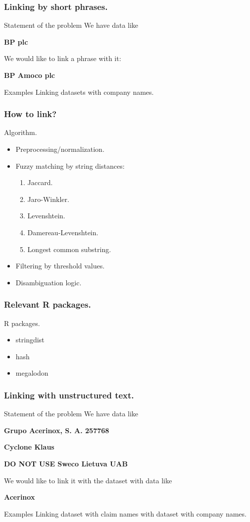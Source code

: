 \documentclass{beamer}
\begin{document}
\begin{frame}
\frametitle{Linking by short phrases.}
\begin{block}{Statement of the problem}
We have data like

\textbf{BP plc}

We would like to link a phrase with it:

\textbf{BP Amoco plc}

\end{block}
\begin{block}{Examples}
Linking datasets with company names.
\end{block}
\end{frame}
\begin{frame}[fragile]
\frametitle{How to link?}
\begin{block}{Algorithm.}
\begin{itemize}
  \item Preprocessing/normalization.
	\item Fuzzy matching by string distances:
	
	\begin{enumerate}
		\item Jaccard.
		\item Jaro-Winkler.
		\item Levenshtein.
		\item Damereau-Levenshtein.
		\item Longest common substring.
	\end{enumerate}
	\item Filtering by threshold values.
	\item Disambiguation logic.
\end{itemize}
\end{block}
\end{frame}
\begin{frame}[fragile]
\frametitle{Relevant R packages.}
\begin{block}{R packages.}
\begin{itemize}
\item stringdist
\item hash
\item megalodon
\end{itemize}
\end{block}
\end{frame}
\begin{frame}
\frametitle{Linking with unstructured text.}
\begin{block}{Statement of the problem}
We have data like

\textbf{Grupo Acerinox, S. A. 257768}

\textbf{Cyclone Klaus}

\textbf{DO NOT USE Sweco Lietuva UAB}

We would like to link it with the dataset with data like

\textbf{Acerinox}

\end{block}
\begin{block}{Examples}
Linking dataset with claim names with dataset with company names.
\end{block}
\end{frame}
\end{document}
